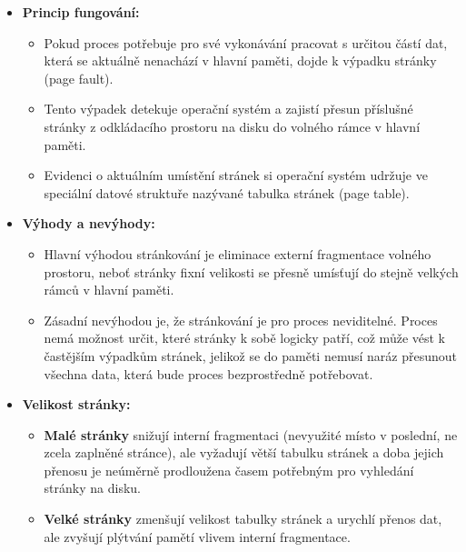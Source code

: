         \begin{itemize}
            \item \textbf{Princip fungování:}
            \begin{itemize}
                \item Pokud proces potřebuje pro své vykonávání pracovat s určitou částí dat, která se aktuálně nenachází v hlavní paměti, dojde k výpadku stránky (page fault).
                \item Tento výpadek detekuje operační systém a zajistí přesun příslušné stránky z odkládacího prostoru na disku do volného rámce v hlavní paměti.
                \item Evidenci o aktuálním umístění stránek si operační systém udržuje ve speciální datové struktuře nazývané tabulka stránek (page table).
            \end{itemize}
        
            \item \textbf{Výhody a nevýhody:}
            \begin{itemize}
                \item Hlavní výhodou stránkování je eliminace externí fragmentace volného prostoru, neboť stránky fixní velikosti se přesně umísťují do stejně velkých rámců v hlavní paměti.
                \item Zásadní nevýhodou je, že stránkování je pro proces neviditelné. Proces nemá možnost určit, které stránky k sobě logicky patří, což může vést k častějším výpadkům stránek, jelikož se do paměti nemusí naráz přesunout všechna data, která bude proces bezprostředně potřebovat.
            \end{itemize}
        
            \item \textbf{Velikost stránky:}
            \begin{itemize}
                \item \textbf{Malé stránky} snižují interní fragmentaci (nevyužité místo v poslední, ne zcela zaplněné stránce), ale vyžadují větší tabulku stránek a doba jejich přenosu je neúměrně prodloužena časem potřebným pro vyhledání stránky na disku.
                \item \textbf{Velké stránky} zmenšují velikost tabulky stránek a urychlí přenos dat, ale zvyšují plýtvání pamětí vlivem interní fragmentace.
            \end{itemize}
        \end{itemize}
